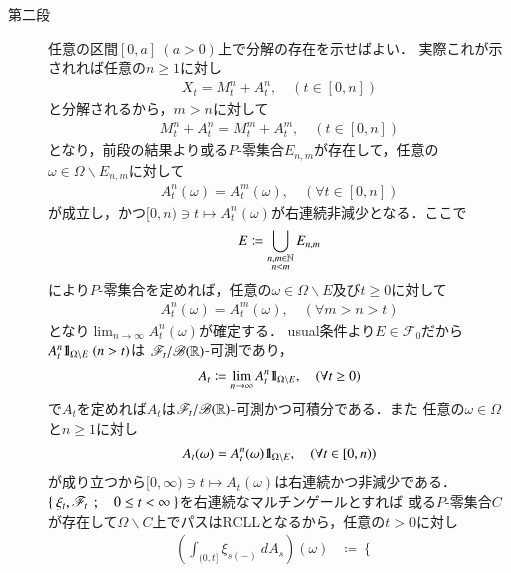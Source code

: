 \begin{prf}
\begin{description}
			\item[第二段]
				任意の区間$[0,a]\ (a>0)$上で分解の存在を示せばよい．
				実際これが示されれば任意の$n \geq 1$に対し
				\begin{align}
					X_t = M^n_t + A^n_t, \quad (t \in [0,n])
				\end{align}
				と分解されるから，$m > n$に対して
				\begin{align}
					M^n_t + A^n_t = M^m_t + A^m_t, \quad (t \in [0,n])
				\end{align}
				となり，前段の結果より或る$P$-零集合$E_{n,m}$が存在して，任意の$\omega \in \Omega \backslash E_{n,m}$に対して
				\begin{align}
					A^n_t(\omega) = A^m_t(\omega), \quad (\forall t \in [0,n])
				\end{align}
				が成立し，かつ$[0,n) \ni t \longmapsto A^n_t(\omega)$が右連続非減少となる．ここで
				\begin{align}
					E \coloneqq \bigcup_{\substack{n,m \in \mathbb{N} \\ n<m}} E_{n,m}
				\end{align}
				により$P$-零集合を定めれば，任意の$\omega \in \Omega \backslash E$及び$t \geq 0$に対して
				\begin{align}
					A^n_t(\omega) = A^m_t(\omega), \quad (\forall m > n > t)
				\end{align}
				となり$\lim_{n \to \infty} A^n_t(\omega)$が確定する．
				usual条件より$E \in \mathscr{F}_0$だから$A^n_t \mbox{1}\hspace{-0.25em}\mbox{l}_{\Omega \backslash E}\ (n > t)$は
				$\mathscr{F}_t/\mathscr{B}(\mathbb{R})$-可測であり，
				\begin{align}
					A_t \coloneqq  \lim_{n \to \infty} A^n_t \mbox{1}\hspace{-0.25em}\mbox{l}_{\Omega \backslash E},
					\quad (\forall t \geq 0)
				\end{align}
				で$A_t$を定めれば$A_t$は$\mathscr{F}_t/\mathscr{B}(\mathbb{R})$-可測かつ可積分である．また
				任意の$\omega \in \Omega$と$n \geq 1$に対し
				\begin{align}
					A_t(\omega) = A^n_t(\omega) \mbox{1}\hspace{-0.25em}\mbox{l}_{\Omega \backslash E}, \quad (\forall t \in [0,n))
				\end{align}
				が成り立つから$[0,\infty) \ni t \longmapsto A_t(\omega)$は右連続かつ非減少である．
				$\left\{\ \xi_t,\mathscr{F}_t\ \, ; \quad 0 \leq t < \infty\ \right\}$を右連続なマルチンゲールとすれば
				或る$P$-零集合$C$が存在して$\Omega \backslash C$上でパスはRCLLとなるから，任意の$t > 0$に対し
				\begin{align}
					\left( \int_{(0,t]} \xi_{s(-)}\ dA_s \right)(\omega) &\coloneqq
					\begin{cases}

\end{cases}
\end{align}
\end{description}
\end{prf}
